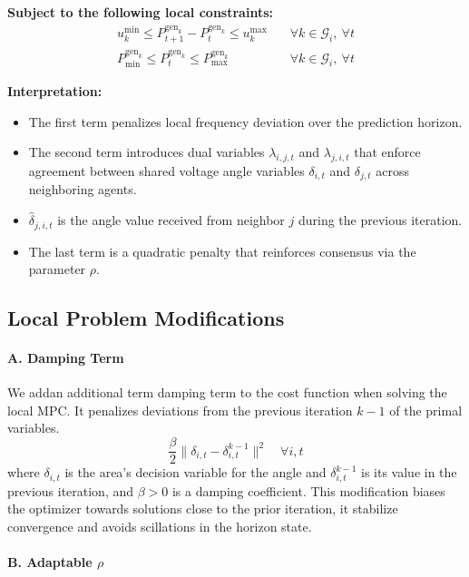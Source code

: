 \documentclass{article}
\begin{document}
\textbf{Subject to the following local constraints:}
\begin{align}
    u^{\min}_k \leq P^{\text{gen}_k}_{t+1} - P^{\text{gen}_k}_t \leq u^{\max}_k \quad &\forall k \in \mathcal{G}_i,\ \forall t \\
    P^{\text{gen}_k}_{\min} \leq P^{\text{gen}_k}_t \leq P^{\text{gen}_k}_{\max} \quad &\forall k \in \mathcal{G}_i,\ \forall t
\end{align}

\textbf{Interpretation:}
\begin{itemize}
    \item The first term penalizes local frequency deviation over the prediction horizon.
    \item The second term introduces dual variables $\lambda_{i,j,t}$ and $\lambda_{j,i,t}$ that enforce agreement between shared voltage angle variables $\delta_{i,t}$ and $\delta_{j,t}$ across neighboring agents.
    \item $\hat{\delta}_{j,i,t}$ is the angle value received from neighbor $j$ during the previous iteration.
    \item The last term is a quadratic penalty that reinforces consensus via the parameter $\rho$.
\end{itemize}

\subsection*{Local Problem Modifications}

\paragraph{A. Damping Term} 
We addan additional term damping term to the cost function when solving the local MPC. It penalizes deviations from the previous iteration $k-1$ of the primal variables. 
\[
 \frac{\beta}{2} \|\delta_{i,t} - \delta_{i,t}^{k-1}\|^2 \quad \forall i,t
\]
where $\delta_{i,t}$ is the area's decision variable for the angle and  $\delta_{i,t}^{k-1}$ is its value in the previous iteration, and \( \beta > 0 \) is a damping coefficient. This modification biases the optimizer towards solutions close to the prior iteration, it stabilize convergence and avoids scillations in the horizon state.

\paragraph{B. Adaptable \(\rho\)} 
\end{document}
